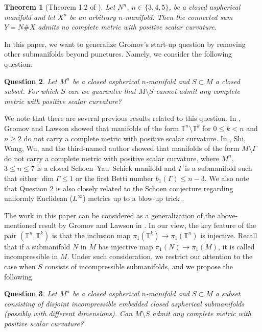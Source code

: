 \documentclass[11pt, reqno]{amsart}
\numberwithin{equation}{section}
\newtheorem{theorem}{Theorem}[section]
\newtheorem{question}[theorem]{Question}
\theoremstyle{definition}
\begin{document}
\begin{theorem}[{Theorem 1.2 of \cite{CCZ23}}]\label{Thm: connected sum}
Let $N^n$, $n\in\{3,4,5\}$, be a closed aspherical manifold and let $X^n$ be an arbitrary $n$-manifold. Then the connected sum $Y= N \# X$ admits no complete metric with positive scalar curvature.
\end{theorem}

In this paper, we want to generalize Gromov's start-up question by removing other submanifolds beyond punctures. Namely, we consider the following question:

\begin{question}\label{Que: main_original}
Let $M^n$ be a closed aspherical $n$-manifold and $S\subset M$ a closed subset.
For which $S$ can we guarantee that $M\setminus S$ cannot admit any complete metric with positive scalar curvature?
\end{question}




We note that there are several previous results related to this question. In \cite{GL83}, Gromov and Lawson showed that manifolds of the form $\mathbb{T}^n \setminus \mathbb{T}^k$ for $0 \le k < n$ and $n \ge 2$ do not carry a complete metric with positive scalar curvature. In \cite{SWWZ24}, Shi, Wang, Wu, and the third-named author showed that manifolds of the form $M\setminus \Gamma$ do not carry a complete metric with positive scalar curvature, where $M^n$, $3\le n \le 7$ is a closed Schoen--Yau--Schick manifold and $\Gamma$ is a submanifold such that either $\dim\Gamma \le 1$ or the first Betti number $b_1(\Gamma) \le n - 3$. We also note that Question \ref{Que: main_original} is also closely related to the Schoen conjecture regarding uniformly Euclidean ($L^\infty$) metrics up to a blow-up trick \cite{LM19}.



The work in this paper can be considered as a generalization of the above-mentioned result by Gromov and Lawson in \cite{GL83}. In our view, the key feature of the pair $(\mathbb T^n,\mathbb T^k)$ is that the inclusion map $\pi_1(\mathbb T^k)\to \pi_1(\mathbb T^n)$ is injective. Recall that if a submanifold $N$ in $M$ has injective map $\pi_1(N)\to\pi_1(M)$, it is called incompressible in $M$. Under such consideration, we restrict our attention to the case when $S$ consists of incompressible submanifolds, and we propose the following
\begin{question}\label{Que: main}
Let $M^n$ be a closed aspherical $n$-manifold and $S\subset M$ a subset consisting of disjoint incompressible embedded closed aspherical submanifolds (possibly with different dimensions).
Can $M\setminus S$ admit any complete metric with positive scalar curvature?
\end{question}
\end{document}
